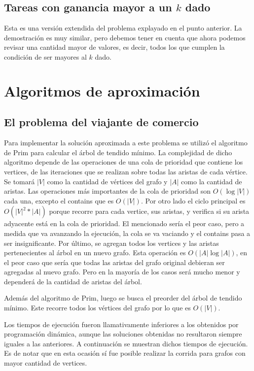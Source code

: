 \documentclass[a4paper,10pt]{article}
\begin{document}
\subsection{Tareas con ganancia mayor a un \(k\) dado}

Esta es una versión extendida del problema explayado en el punto anterior. La demostración es muy similar, pero debemos tener en cuenta que ahora podemos revisar una cantidad mayor de valores, es decir, todos los que cumplen la condición de ser mayores al \(k\) dado.

\section{Algoritmos de aproximación}

\subsection{El problema del viajante de comercio}

Para implementar la solución aproximada a este problema se utilizó el algoritmo de Prim para calcular el árbol de tendido mínimo. La complejidad de dicho algoritmo depende de las operaciones de una cola de prioridad que contiene los vertices, de las iteraciones que se realizan sobre todas las aristas de cada vértice. Se tomará $|V|$ como la cantidad de vértices del grafo y $|A|$ como la cantidad de aristas. 
Las operaciones más importantes de la cola de prioridad son $O(\log{|V|})$ cada una, excepto el contains que es $O(|V|)$.
Por otro lado el ciclo principal es $O(|V|^2 *|A|)$ porque recorre para cada vertice, sus aristas, y verifica si su arista adyacente está en la cola de prioridad. El mencionado sería el peor caso, pero a medida que va avanzando la ejecución, la cola se va vaciando y el contains pasa a ser insignificante. Por último, se agregan todos los vertices y las aristas pertenecientes al árbol en un nuevo grafo. Esta operación es $O(|A| \log{|A|})$, en el peor caso que sería que todas las aristas del grafo original debieran ser agregadas al nuevo grafo. Pero en la mayoría de los casos será mucho menor y dependerá de la cantidad de aristas del árbol.

Además del algoritmo de Prim, luego se busca el preorder del árbol de tendido mínimo. Este recorre todos los vértices del grafo por lo que es $O(|V|)$.

Los tiempos de ejecución fueron llamativamente inferiores a los obtenidos por programación dinámica, aunque las soluciones obtenidas no resultaron siempre iguales a las anteriores. A continuación se muestran dichos tiempos de ejecución. Es de notar que en esta ocasión sí fue posible realizar la corrida para grafos con mayor cantidad de vertices.
\end{document}
